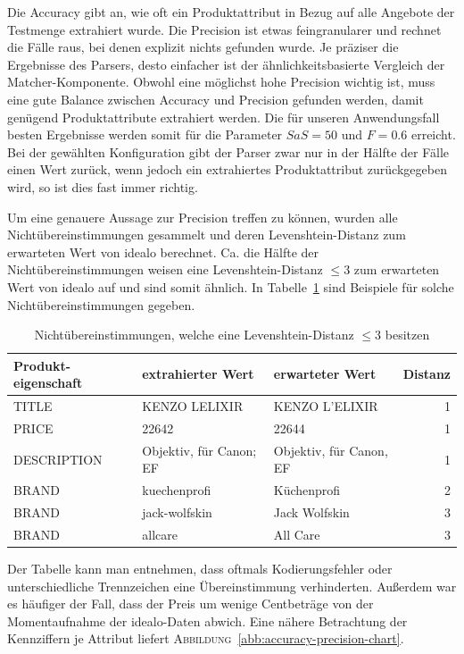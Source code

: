 Die Accuracy gibt an, wie oft ein Produktattribut in Bezug auf alle Angebote der Testmenge extrahiert wurde.
Die Precision ist etwas feingranularer und rechnet die Fälle raus, bei denen explizit nichts gefunden wurde.
Je präziser die Ergebnisse des Parsers, desto einfacher ist der ähnlichkeitsbasierte Vergleich der Matcher-Komponente.
Obwohl eine möglichst hohe Precision wichtig ist, muss eine gute Balance zwischen Accuracy und Precision gefunden
werden, damit genügend Produktattribute extrahiert werden.
Die für unseren Anwendungsfall besten Ergebnisse werden somit für die Parameter $SaS = 50$ und $F= 0.6$ erreicht.
Bei der gewählten Konfiguration gibt der Parser zwar nur in der Hälfte der Fälle einen Wert zurück, wenn jedoch ein
extrahiertes Produktattribut zurückgegeben wird, so ist dies fast immer richtig.

Um eine genauere Aussage zur Precision treffen zu können, wurden alle Nichtübereinstimmungen gesammelt und deren
Levenshtein-Distanz zum erwarteten Wert von idealo berechnet.
Ca. die Hälfte der Nichtübereinstimmungen weisen eine Levenshtein-Distanz $\leq 3$ zum erwarteten Wert von idealo
auf und sind somit ähnlich.
In Tabelle~\ref{tab:levenshtein-examples} sind Beispiele für solche Nichtübereinstimmungen gegeben.

\begin{table}[h]
    \centering
    \begin{tabular}{ p{2.75cm} | p{4.5cm} | p{4.5cm} | r{1cm}}
        \textbf{Produkt-eigenschaft} & \textbf{extrahierter Wert} & \textbf{erwarteter Wert} &
        \textbf{Distanz} \\
        \hline
        TITLE & KENZO LELIXIR & KENZO L'ELIXIR & 1\\
        PRICE & 22642 & 22644 & 1\\
        DESCRIPTION & Objektiv, für Canon; EF	& Objektiv, für Canon, EF & 1\\
        BRAND &	kuechenprofi & Küchenprofi & 2\\
        BRAND & jack-wolfskin & Jack Wolfskin & 3\\
        BRAND & allcare & All Care & 3
    \end{tabular}
    \caption{Nichtübereinstimmungen, welche eine Levenshtein-Distanz $\leq 3$ besitzen}
    \label{tab:levenshtein-examples}
    \vspace{-0.25cm}
\end{table}

Der Tabelle kann man entnehmen, dass oftmals Kodierungsfehler oder unterschiedliche Trennzeichen eine
Übereinstimmung verhinderten.
Außerdem war es häufiger der Fall, dass der Preis um wenige Centbeträge von der Momentaufnahme der idealo-Daten
abwich.
\newpage
Eine nähere Betrachtung der Kennziffern je Attribut liefert \textsc{Abbildung}~\ref{abb:accuracy-precision-chart}.

